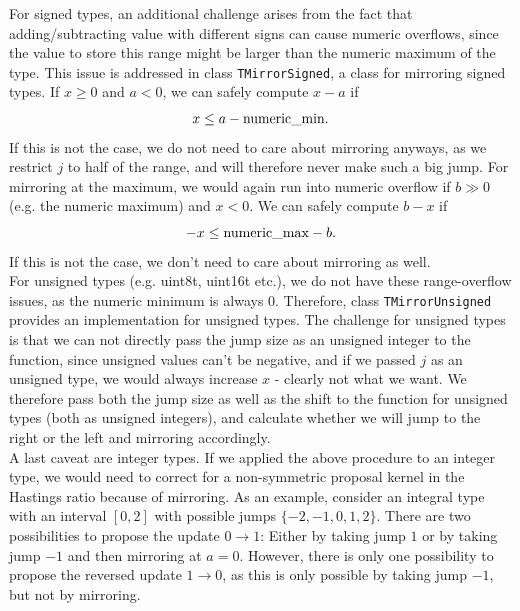 \documentclass[a4paper,11pt]{article}
\newcommand{\class}[1]{\texttt{#1}}
\begin{document}
For signed types, an additional challenge arises from the fact that adding/subtracting value with different signs can cause numeric overflows, since the value to store this range might be larger than the numeric maximum of the type. This issue is addressed in class \class{TMirrorSigned}, a class for mirroring signed types. If $x\geq0$ and $a<0$, we can safely compute $x-a$ if
\begin{equation*}
 x \leq a - \text{numeric{\textunderscore}min}.
\end{equation*}
If this is not the case, we do not need to care about mirroring anyways, as we restrict $j$ to half of the range, and will therefore never make such a big jump.
For mirroring at the maximum, we would again run into numeric overflow if $b\gg0$ (e.g. the numeric maximum) and $x<0$. We can safely compute $b-x$ if
\begin{equation*}
 -x \leq \text{numeric{\textunderscore}max} - b.
\end{equation*}
If this is not the case, we don't need to care about mirroring as well.\\

For unsigned types (e.g. uint8{\textunderscore}t, uint16{\textunderscore}t etc.), we do not have these range-overflow issues, as the numeric minimum is always 0. Therefore, class \class{TMirrorUnsigned} provides an implementation for unsigned types. The challenge for unsigned types is that we can not directly pass the jump size as an unsigned integer to the function, since unsigned values can't be negative, and if we passed $j$ as an unsigned type, we would always increase $x$ - clearly not what we want. We therefore pass both the jump size as well as the shift to the function for unsigned types (both as unsigned integers), and calculate whether we will jump to the right or the left and mirroring accordingly.\\

A last caveat are integer types. If we applied the above procedure to an integer type, we would need to correct for a non-symmetric proposal kernel in the Hastings ratio because of mirroring. As an example, consider an integral type with an interval $[0,2]$ with possible jumps $\{-2, -1, 0, 1, 2\}$. There are two possibilities to propose the update $0 \to 1$: Either by taking jump $1$ or by taking jump $-1$ and then mirroring at $a = 0$. However, there is only one possibility to propose the reversed update $1 \to 0$, as this is only possible by taking jump $-1$, but not by mirroring.
\end{document}
